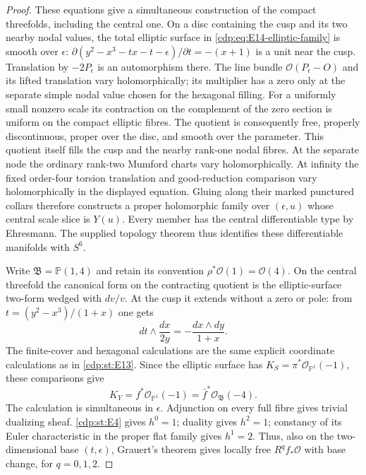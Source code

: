 \begin{proof}
These equations give a simultaneous construction of the compact
threefolds, including the central one. On a disc containing the cusp
and its two nearby nodal values, the total elliptic surface in
\eqref{cdp:eq:E14-elliptic-family} is smooth over $\epsilon$:
$\partial(y^2-x^3-tx-t-\epsilon)/\partial t=-(x+1)$ is a unit
near the cusp. Translation by $-2P_\epsilon$ is an automorphism
there. The line bundle $\mathcal O(P_\epsilon-O)$ and its lifted
translation vary holomorphically; its multiplier has a zero only
at the separate simple nodal value chosen for the hexagonal filling.
For a uniformly small nonzero scale its contraction on the
complement of the zero section is uniform on the compact elliptic
fibres. The quotient is consequently free, properly discontinuous,
proper over the disc, and smooth over the parameter. This quotient
itself fills the cusp and the nearby rank-one nodal fibres. At the
separate node the ordinary rank-two Mumford charts vary
holomorphically. At infinity the fixed order-four torsion translation
and good-reduction comparison vary holomorphically in the displayed
equation. Gluing along their marked punctured collars therefore
constructs a proper holomorphic family over $(\epsilon,u)$ whose
central scale slice is $Y(u)$. Every member has the central
differentiable type by Ehresmann. The supplied topology theorem
\cite[Theorem labelled \texttt{thm: main}]{LiuRollenske2026} thus
identifies these differentiable manifolds with $S^6$.

Write $\mathfrak B=\mathbb P(1,4)$ and retain its convention
$\rho^*\mathcal O(1)=\mathcal O(4)$. On the central threefold the
canonical form on the contracting quotient is the elliptic-surface
two-form wedged with $dv/v$. At the cusp it extends without a zero
or pole: from $t=(y^2-x^3)/(1+x)$ one gets
\[
 dt\wedge\frac{dx}{2y}=-\frac{dx\wedge dy}{1+x}.
\]
The finite-cover and hexagonal calculations are the same explicit
coordinate calculations as in \ref{cdp:st:E13}. Since the elliptic surface has
$K_S=\pi^*\mathcal O_{\mathbb P^1}(-1)$, these comparisons give
\begin{equation}\label{cdp:eq:E14-canonical}
 K_Y=f^*\mathcal O_{\mathbb P^1}(-1)
     =\bar f^*\mathcal O_{\mathfrak B}(-4).
\end{equation}
The calculation is simultaneous in $\epsilon$. Adjunction on every
full fibre gives trivial dualizing sheaf. \ref{cdp:st:E4} gives $h^0=1$;
duality gives $h^2=1$; constancy of its Euler characteristic in the
proper flat family gives $h^1=2$. Thus, also on the two-dimensional
base $(t,\epsilon)$, Grauert's theorem gives locally free $R^qf_*\mathcal O$
with base change, for $q=0,1,2$.


\end{proof}
